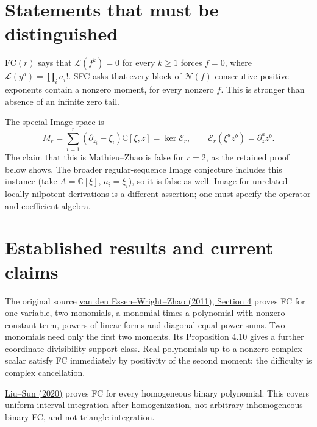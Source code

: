 \documentclass[11pt]{article}
\newcommand{\Lfac}{\mathcal L}
\newcommand{\C}{\mathbb C}
\begin{document}
\section*{Statements that must be distinguished}
FC$(r)$ says that $\Lfac(f^k)=0$ for every $k\geq1$ forces $f=0$, where
$\Lfac(y^a)=\prod_i a_i!$. SFC asks that every block of $\mathcal N(f)$
consecutive positive exponents contain a nonzero moment, for every
nonzero $f$. This is stronger than absence of an infinite zero tail.

The special Image space is
\[
 M_r=\sum_{i=1}^r(\partial_{z_i}-\xi_i)\C[\xi,z]=\ker\mathcal E_r,
 \qquad \mathcal E_r(\xi^a z^b)=\partial_z^a z^b.
\]
The claim that this is Mathieu--Zhao is false for $r=2$, as the retained
proof below shows. The broader regular-sequence Image conjecture includes
this instance (take $A=\C[\xi]$, $a_i=\xi_i$), so it is false as well.
Image for unrelated locally nilpotent derivations is a different assertion;
one must specify the operator and coefficient algebra.

\section*{Established results and current claims}
The original source
\href{https://arxiv.org/abs/1008.3962v2}{van den Essen--Wright--Zhao (2011),
Section 4} proves FC for one variable, two monomials, a monomial times a
polynomial with nonzero constant term, powers of linear forms and diagonal
equal-power sums. Two monomials need only the first two moments.
Its Proposition 4.10 gives a further coordinate-divisibility support class.
Real polynomials up to a nonzero complex scalar satisfy FC immediately
by positivity of the second moment; the difficulty is complex cancellation.

\href{https://doi.org/10.1017/S0004972719000546}{Liu--Sun (2020)} proves FC
for every homogeneous binary polynomial. This covers uniform interval
integration after homogenization, not arbitrary inhomogeneous binary FC,
and not triangle integration.
\end{document}
